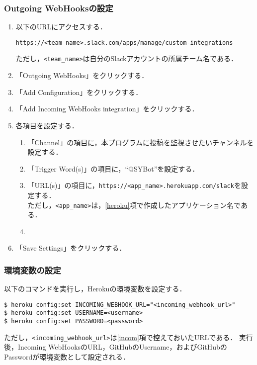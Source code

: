 \documentclass[12pt]{jsarticle}
\begin{document}
\begin{enumerate}
\subsubsection{Outgoing WebHooksの設定}
\begin{enumerate}
\item 以下のURLにアクセスする．
\begin{verbatim}
https://<team_name>.slack.com/apps/manage/custom-integrations
\end{verbatim}
ただし，\verb|<team_name>|は自分のSlackアカウントの所属チーム名である．
\item 「Outgoing WebHooks」をクリックする．
\item 「Add Configuration」をクリックする．
\item 「Add Incoming WebHooks integration」をクリックする．
\item 各項目を設定する．
  \begin{enumerate}
  \item 「Channel」の項目に，本プログラムに投稿を監視させたいチャンネルを設定する．
  \item 「Trigger Word(s)」の項目に，``@SYBot''を設定する．
  \item 「URL(s)」の項目に，\verb|https://<app_name>.herokuapp.com/slack|を設定する．\\
    ただし，\verb|<app_name>|は，\ref{heroku}項で作成したアプリケーション名である．
  \item
  \end{enumerate}
\item 「Save Settings」をクリックする．
\end{enumerate}
\subsubsection{環境変数の設定}
 以下のコマンドを実行し，Herokuの環境変数を設定する．
 \begin{description}
 \item \verb|$ heroku config:set INCOMING_WEBHOOK_URL="<incoming_webhook_url>"|\\
   \verb|$ heroku config:set USERNAME=<username>|\\
   \verb|$ heroku config:set PASSWORD=<password>|
 \end{description}
 ただし，\verb|<incoming_webhook_url>|は\ref{incom}項で控えておいたURLである．
 実行後，Incoming WebHooksのURL，GitHubのUsername，およびGitHubのPasswordが環境変数として設定される．
\end{enumerate}
\end{document}
